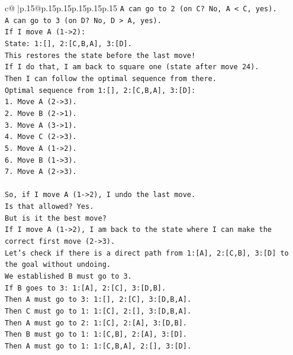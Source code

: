 \documentclass{article}
\begin{document}
{\begin{supertabular}{c@{$\;$}|p{.15\linewidth}@{}p{.15\linewidth}p{.15\linewidth}p{.15\linewidth}p{.15\linewidth}p{.15\linewidth}}
{{{\texttt{A can go to 2 (on C? No, A < C, yes).} \\
\texttt{A can go to 3 (on D? No, D > A, yes).} \\
\texttt{If I move A (1{-}>2):} \\
\texttt{State: 1:{[}{]}, 2:{[}C,B,A{]}, 3:{[}D{]}.} \\
\texttt{This restores the state before the last move!} \\
\texttt{If I do that, I am back to square one (state after move 24).} \\
\texttt{Then I can follow the optimal sequence from there.} \\
\texttt{Optimal sequence from 1:{[}{]}, 2:{[}C,B,A{]}, 3:{[}D{]}:} \\
\texttt{1. Move A (2{-}>3).} \\
\texttt{2. Move B (2{-}>1).} \\
\texttt{3. Move A (3{-}>1).} \\
\texttt{4. Move C (2{-}>3).} \\
\texttt{5. Move A (1{-}>2).} \\
\texttt{6. Move B (1{-}>3).} \\
\texttt{7. Move A (2{-}>3).} \\
\\ 
\texttt{So, if I move A (1{-}>2), I undo the last move.} \\
\texttt{Is that allowed? Yes.} \\
\texttt{But is it the best move?} \\
\texttt{If I move A (1{-}>2), I am back to the state where I can make the correct first move (2{-}>3).} \\
\texttt{Let's check if there is a direct path from 1:{[}A{]}, 2:{[}C,B{]}, 3:{[}D{]} to the goal without undoing.} \\
\texttt{We established B must go to 3.} \\
\texttt{If B goes to 3: 1:{[}A{]}, 2:{[}C{]}, 3:{[}D,B{]}.} \\
\texttt{Then A must go to 3: 1:{[}{]}, 2:{[}C{]}, 3:{[}D,B,A{]}.} \\
\texttt{Then C must go to 1: 1:{[}C{]}, 2:{[}{]}, 3:{[}D,B,A{]}.} \\
\texttt{Then A must go to 2: 1:{[}C{]}, 2:{[}A{]}, 3:{[}D,B{]}.} \\
\texttt{Then B must go to 1: 1:{[}C,B{]}, 2:{[}A{]}, 3:{[}D{]}.} \\
\texttt{Then A must go to 1: 1:{[}C,B,A{]}, 2:{[}{]}, 3:{[}D{]}.} \\
}}}
\end{supertabular}}
\end{document}
